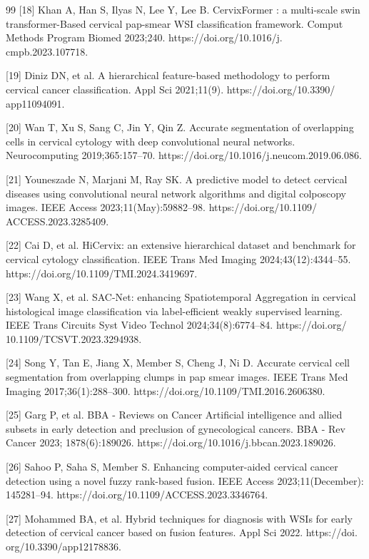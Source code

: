 \documentclass[final,5p,times,twocolumn,authoryear]{elsarticle}
\begin{document}
\begin{thebibliography}{99}
 [18] Khan A, Han S, Ilyas N, Lee Y, Lee B. CervixFormer : a multi-scale swin transformer-Based cervical pap-smear WSI classification framework. Comput Methods Program Biomed 2023;240. https://doi.org/10.1016/j. cmpb.2023.107718.

 [19] Diniz DN, et al. A hierarchical feature-based methodology to perform cervical cancer classification. Appl Sci 2021;11(9). https://doi.org/10.3390/ app11094091.

 [20] Wan T, Xu S, Sang C, Jin Y, Qin Z. Accurate segmentation of overlapping cells in cervical cytology with deep convolutional neural networks. Neurocomputing 2019;365:157–70. https://doi.org/10.1016/j.neucom.2019.06.086.

 [21] Youneszade N, Marjani M, Ray SK. A predictive model to detect cervical diseases using convolutional neural network algorithms and digital colposcopy images. IEEE Access 2023;11(May):59882–98. https://doi.org/10.1109/ ACCESS.2023.3285409.

 [22] Cai D, et al. HiCervix: an extensive hierarchical dataset and benchmark for cervical cytology classification. IEEE Trans Med Imaging 2024;43(12):4344–55. https://doi.org/10.1109/TMI.2024.3419697.

 [23] Wang X, et al. SAC-Net: enhancing Spatiotemporal Aggregation in cervical histological image classification via label-efficient weakly supervised learning. IEEE Trans Circuits Syst Video Technol 2024;34(8):6774–84. https://doi.org/ 10.1109/TCSVT.2023.3294938.

 [24] Song Y, Tan E, Jiang X, Member S, Cheng J, Ni D. Accurate cervical cell segmentation from overlapping clumps in pap smear images. IEEE Trans Med Imaging 2017;36(1):288–300. https://doi.org/10.1109/TMI.2016.2606380.

 [25] Garg P, et al. BBA - Reviews on Cancer Artificial intelligence and allied subsets in early detection and preclusion of gynecological cancers. BBA - Rev Cancer 2023; 1878(6):189026. https://doi.org/10.1016/j.bbcan.2023.189026.

 [26] Sahoo P, Saha S, Member S. Enhancing computer-aided cervical cancer detection using a novel fuzzy rank-based fusion. IEEE Access 2023;11(December): 145281–94. https://doi.org/10.1109/ACCESS.2023.3346764.

 [27] Mohammed BA, et al. Hybrid techniques for diagnosis with WSIs for early detection of cervical cancer based on fusion features. Appl Sci 2022. https://doi. org/10.3390/app12178836.


\end{thebibliography}
\end{document}
